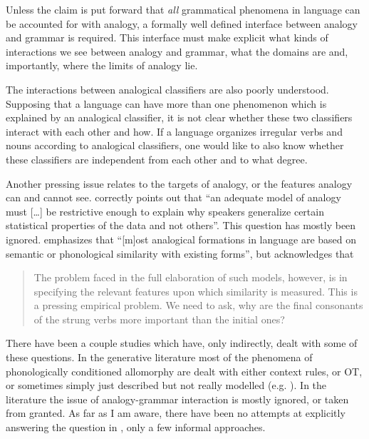 Unless the claim is put forward that \textit{all} grammatical phenomena in language can be accounted for with analogy, a formally well defined interface between analogy and grammar is required. This interface must make explicit what kinds of interactions we see between analogy and grammar, what the domains are and, importantly, where the limits of analogy lie.

The interactions between analogical classifiers are also poorly understood. Supposing that a language can have more than one phenomenon which is explained by an analogical classifier, it is not clear whether these two classifiers interact with each other and how. If a language organizes irregular verbs and nouns according to analogical classifiers, one would like to also know whether these classifiers are independent from each other and to what degree.

Another pressing issue relates to the targets of analogy, or the features analogy can and cannot see. \textcite[185]{Albright.2009} correctly points out that ``an adequate model of analogy must [\dots] be restrictive enough to explain why speakers generalize certain statistical properties of the data and not others''. This question has mostly been ignored. \textcite[54]{Bybee.2010} emphasizes that ``[m]ost analogical formations in language are based on semantic or phonological similarity with existing forms'', but acknowledges that

\begin{quotation}
  The problem faced in the full elaboration of such models, however, is in specifying the relevant features upon which similarity is measured.
  This is a pressing empirical problem. We need to ask, why are the final consonants of the strung verbs more important than the initial ones? \autocite[62]{Bybee.2010}
\end{quotation}

There have been a couple studies which have, only indirectly, dealt with some of these questions. In the generative literature most of the phenomena of phonologically conditioned allomorphy are dealt with either context rules, or OT, or sometimes simply just described but not really modelled (e.g. \citealt[119]{Rubach.2007}). In the  literature the issue of analogy-grammar interaction is mostly ignored, or taken from granted. As far as I am aware, there have been no attempts at explicitly answering the question in , only a few informal approaches.

